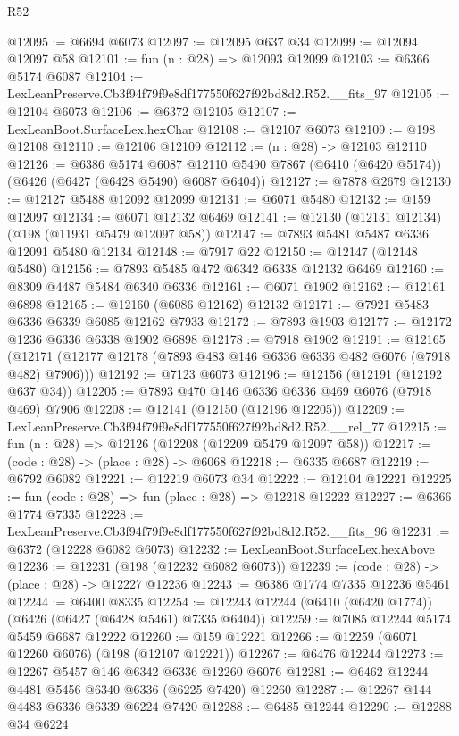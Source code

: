 \begin{lexlean}{R52}
\begin{coremodule}
@12095 := @6694 @6073
@12097 := @12095 @637 @34
@12099 := @12094 @12097 @58
@12101 := fun (n : @28) => @12093 @12099
@12103 := @6366 @5174 @6087
@12104 := LexLeanPreserve.Cb3f94f79f9e8df177550f627f92bd8d2.R52.__fits_97
@12105 := @12104 @6073
@12106 := @6372 @12105
@12107 := LexLeanBoot.SurfaceLex.hexChar
@12108 := @12107 @6073
@12109 := @198 @12108
@12110 := @12106 @12109
@12112 := (n : @28) -> @12103 @12110
@12126 := @6386
    @5174
    @6087
    @12110
    @5490
    @7867
    (@6410 (@6420 @5174))
    (@6426 (@6427 (@6428 @5490) @6087 @6404))
@12127 := @7878 @2679
@12130 := @12127 @5488 @12092 @12099
@12131 := @6071 @5480
@12132 := @159 @12097
@12134 := @6071 @12132 @6469
@12141 := @12130 (@12131 @12134) (@198 (@11931 @5479 @12097 @58))
@12147 := @7893 @5481 @5487 @6336 @12091 @5480 @12134
@12148 := @7917 @22
@12150 := @12147 (@12148 @5480)
@12156 := @7893 @5485 @472 @6342 @6338 @12132 @6469
@12160 := @8309 @4487 @5484 @6340 @6336
@12161 := @6071 @1902
@12162 := @12161 @6898
@12165 := @12160 (@6086 @12162) @12132
@12171 := @7921 @5483 @6336 @6339 @6085 @12162 @7933
@12172 := @7893 @1903
@12177 := @12172 @1236 @6336 @6338 @1902 @6898
@12178 := @7918 @1902
@12191 := @12165
    (@12171 (@12177 @12178 (@7893 @483 @146 @6336 @6336 @482 @6076 (@7918 @482) @7906)))
@12192 := @7123 @6073
@12196 := @12156 (@12191 (@12192 @637 @34))
@12205 := @7893 @470 @146 @6336 @6336 @469 @6076 (@7918 @469) @7906
@12208 := @12141 (@12150 (@12196 @12205))
@12209 := LexLeanPreserve.Cb3f94f79f9e8df177550f627f92bd8d2.R52.__rel_77
@12215 := fun (n : @28) => @12126 (@12208 (@12209 @5479 @12097 @58))
@12217 := (code : @28) -> (place : @28) -> @6068
@12218 := @6335 @6687
@12219 := @6792 @6082
@12221 := @12219 @6073 @34
@12222 := @12104 @12221
@12225 := fun (code : @28) => fun (place : @28) => @12218 @12222
@12227 := @6366 @1774 @7335
@12228 := LexLeanPreserve.Cb3f94f79f9e8df177550f627f92bd8d2.R52.__fits_96
@12231 := @6372 (@12228 @6082 @6073)
@12232 := LexLeanBoot.SurfaceLex.hexAbove
@12236 := @12231 (@198 (@12232 @6082 @6073))
@12239 := (code : @28) -> (place : @28) -> @12227 @12236
@12243 := @6386 @1774 @7335 @12236 @5461
@12244 := @6400 @8335
@12254 := @12243 @12244 (@6410 (@6420 @1774)) (@6426 (@6427 (@6428 @5461) @7335 @6404))
@12259 := @7085 @12244 @5174 @5459 @6687 @12222
@12260 := @159 @12221
@12266 := @12259 (@6071 @12260 @6076) (@198 (@12107 @12221))
@12267 := @6476 @12244
@12273 := @12267 @5457 @146 @6342 @6336 @12260 @6076
@12281 := @6462 @12244 @4481 @5456 @6340 @6336 (@6225 @7420) @12260
@12287 := @12267 @144 @4483 @6336 @6339 @6224 @7420
@12288 := @6485 @12244
@12290 := @12288 @34 @6224

\end{coremodule}
\end{lexlean}
